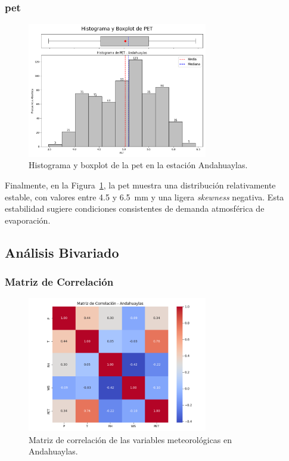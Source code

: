 \subsubsection*{\gls{pet} }
\begin{figure}[htbp]
\centering
\includegraphics[width=0.7\textwidth]{resultados/por_estacion_meteorologica/Andahuaylas/PET_histograma.png}
\caption{Histograma y boxplot de la \gls{pet}  en la estación Andahuaylas.}
\label{fig:andahuaylas_PET}
\end{figure}
Finalmente, en la Figura~\ref{fig:andahuaylas_PET}, la \gls{pet} muestra una distribución relativamente estable, con valores entre 4.5 y 6.5~mm y una ligera \textit{skewness} negativa. Esta estabilidad sugiere condiciones consistentes de demanda atmosférica de evaporación.

\subsection{Análisis Bivariado}

\subsubsection*{Matriz de Correlación}
\begin{figure}[htbp]
\centering
\includegraphics[width=0.7\textwidth]{resultados/por_estacion_meteorologica/Andahuaylas/matriz_correlacion.png}
\caption{Matriz de correlación de las variables meteorológicas en Andahuaylas.}
\label{fig:andahuaylas_corr}
\end{figure}

